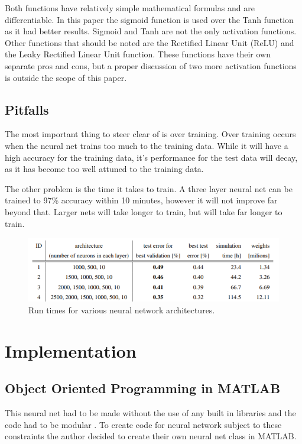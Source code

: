 \documentclass[12pt]{article}
\begin{document}
	Both functions have relatively simple mathematical formulas and are differentiable. In this paper the sigmoid function is used over the Tanh function as it had better results. Sigmoid and Tanh are not the only activation functions. Other functions that should be noted are the Rectified Linear Unit (ReLU) and the Leaky Rectified Linear Unit function. These functions have their own separate pros and cons, but a proper discussion of two more activation functions is outside the scope of this paper. 
	
	\subsection{Pitfalls}
	The most important thing to steer clear of is over training. Over training occurs when the neural net trains too much to the training data. While it will have a high accuracy for the training data, it's performance for the test data will decay, as it has become too well attuned to the training data.  \par 
	
	The other problem is the time it takes to train. A three layer neural net can be trained to 97\% accuracy within 10 minutes, however it will not improve far beyond that. Larger nets will take longer to train, but will take far longer to train. 
	
	\begin{figure}
		\centering
		\includegraphics[width=0.7\linewidth]{nnRunTime}
		\caption{Run times for various neural network architectures\cite{deepBig}.}
		\label{fig:nnruntime}
	\end{figure}
	
	\section{Implementation}
	\subsection{Object Oriented Programming in MATLAB}
	This neural net had to be made without the use of any built in libraries \cite{Hicken18gradProjDes} and the code had to be modular \cite{Hicken18gradProjRubric}. To create code for neural network subject to these constraints the author decided to create their own neural net class in MATLAB. \par 
	
\end{document}
